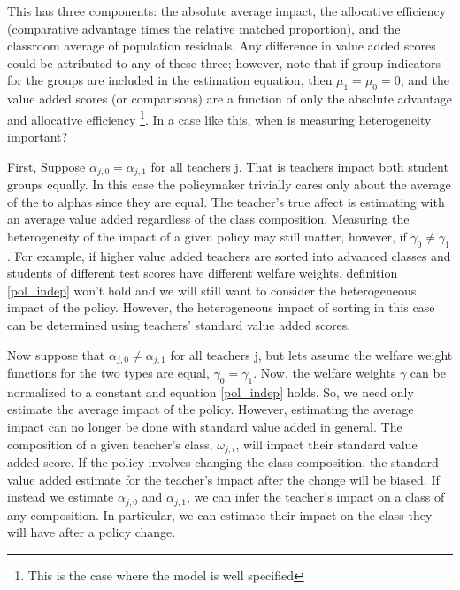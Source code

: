 \documentclass{article}
\theoremstyle{definition}
\theoremstyle{definition}
\theoremstyle{definition}
\theoremstyle{definition}
\begin{document}
    
    This has three components: the absolute average impact, the allocative efficiency (comparative advantage times the relative matched proportion), and the classroom average of population residuals. Any difference in value added scores could be attributed to any of these three; however, note that if group indicators for the groups are included in the estimation equation, then $\mu_1 = \mu_0 = 0$, and the value added scores (or comparisons) are a function of only the absolute advantage and allocative efficiency \footnote{This is the case where the model is well specified}. In a case like this, when is measuring heterogeneity important? 
    
     First, Suppose $\alpha_{j,0} = \alpha_{j,1}$ for all teachers j. That is teachers impact both student groups equally. In this case the policymaker trivially cares only about the average of the to alphas since they are equal. The teacher's true affect is estimating with an average value added regardless of the class composition. Measuring the heterogeneity of the impact of a given policy may still matter, however, if $\gamma_0 \neq \gamma_1$. For example, if higher value added teachers are sorted into advanced classes and students of different test scores have different welfare weights, definition \ref{pol_indep} won't hold and we will still want to consider the heterogeneous impact of the policy. However, the heterogeneous impact of sorting in this case can be determined using teachers' standard value added scores.
     
    Now suppose that $\alpha_{j,0} \neq \alpha_{j,1}$ for all teachers j, but lets assume the welfare weight functions for the two types are equal, $\gamma_0 = \gamma_1$. Now, the welfare weights $\gamma$ can be normalized to a constant and equation \ref{pol_indep} holds. So, we need only estimate the average impact of the policy. However, estimating the average impact can no longer be done with standard value added in general. The composition of a given teacher's class, $\omega_{j,i}$, will impact their standard value added score. If the policy involves changing the class composition, the standard value added estimate for the teacher's impact after the change will be biased. If instead we estimate $\alpha_{j,0}$ and $\alpha_{j,1}$, we can infer the teacher's impact on a class of any composition. In particular, we can estimate their impact on the class they will have after a policy change. 
    
\end{document}
